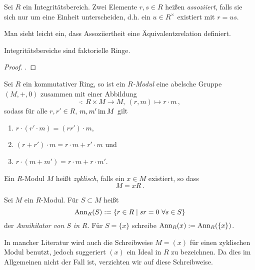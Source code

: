 \begin{definition}
  Sei $R$ ein Integritätsbereich. Zwei Elemente $r,s\in R$ heißen 
  \emph{assoziiert}, falls sie sich nur um eine Einheit unterscheiden, d.h. ein
  $u \in R^\times$ existiert mit $r = us$.
\end{definition}

\begin{bemerkung}
  Man sieht leicht ein, dass Assoziiertheit eine Äquivalentzrelation definiert.
\end{bemerkung}

\begin{satz}
  Integritätsbereiche sind faktorielle Ringe.
\end{satz}
\begin{proof}
  \autocite{}.
\end{proof}

\begin{definition}[Modul]
  Sei $R$ ein kommutativer Ring, so ist ein \emph{$R$-Modul}
  eine abelsche Gruppe $(M,+,0)$ zusammen mit einer 
  Abbildung 
  \[ \cdot:\ R \times M \to M,\ (r,m) \mapsto r\cdot m\,,\]
  sodass für alle $r, r' \in R$, $m,m' \operatorname{im} M$ gilt
  \begin{enumerate}
    \item $r\cdot (r'\cdot m) = (rr')\cdot m$,
    \item $(r+r')\cdot m = r\cdot m + r'\cdot m$ und 
    \item $r\cdot(m+m') = r\cdot m + r\cdot m'$.
  \end{enumerate}
\end{definition}


\begin{definition}
  Ein $R$-Modul $M$ heißt \emph{zyklisch}, falls
  ein $x\in M$ existiert, so dass
  \[ M = xR\,.\]
\end{definition}

\begin{definition}[Annihilator]
  Sei $M$ ein $R$-Modul. Für $S\subset M$ heißt
  \[ \Ann_R(S) := \{ r \in R \mid sr = 0\ \forall s\in S\}\]
  der \emph{Annihilator von $S$ in $R$}. 
  Für $S= \{x\}$ schreibe $\operatorname{Ann}_R(x) := \operatorname{Ann}_R(\{x\})$.
\end{definition}

\begin{bemerkung}
  In mancher Literatur wird auch die Schreibweise $M = (x)$ für einen
  zyklischen Modul benutzt, jedoch suggeriert $(x)$ ein Ideal in $R$ zu
  bezeichnen. Da dies im Allgemeinen nicht der Fall ist, verzichten wir auf
  diese Schreibweise.
\end{bemerkung}


